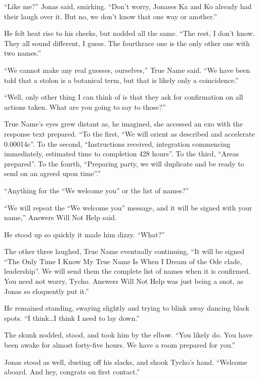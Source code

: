 ``Like me?'' Jonas said, smirking. ``Don't worry, Jonases Ka and Ko already had their laugh over it. But no, we don't know that one way or another.''

He felt heat rise to his cheeks, but nodded all the same. ``The rest, I don't know. They all sound different, I guess. The fourthrace one is the only other one with two names.''

``We cannot make any real guesses, ourselves,'' True Name said. ``We have been told that a stolon is a botanical term, but that is likely only a coincidence.''

``Well, only other thing I can think of is that they ask for confirmation on all actions taken. What are you going to say to those?''

True Name's eyes grew distant as, he imagined, she accessed an exo with the response text prepared. ``To the first, ``We will orient as described and accelerate 0.00014c''. To the second, ``Instructions received, integration commencing immediately, estimated time to completion 428 hours''. To the third, ``Areas prepared''. To the fourth, ``Preparing party, we will duplicate and be ready to send on an agreed upon time''.''

``Anything for the ``We welcome you'' or the list of names?''

``We will repeat the ``We welcome you'' message, and it will be signed with your name,'' Answers Will Not Help said.

He stood up so quickly it made him dizzy. ``What?''

The other three laughed, True Name eventually continuing, ``It will be signed ``The Only Time I Know My True Name Is When I Dream of the Ode clade, leadership''. We will send them the complete list of names when it is confirmed. You need not worry, Tycho. Answers Will Not Help was just being a snot, as Jonas so eloquently put it.''

He remained standing, swaying slightly and trying to blink away dancing black spots. ``I think\ldots I think I need to lay down.''

The skunk nodded, stood, and took him by the elbow. ``You likely do. You have been awake for almost forty-five hours. We have a room prepared for you.''

Jonas stood as well, dusting off his slacks, and shook Tycho's hand. ``Welcome aboard. And hey, congrats on first contact.''
